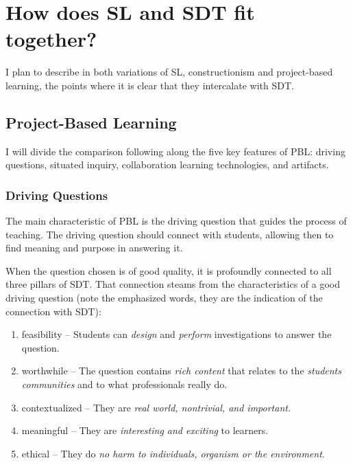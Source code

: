 \section{How does SL and SDT fit together?}

I plan to describe in both variations of SL, constructionism and project-based learning,
the points where it is clear that they intercalate with SDT. 

\subsection{Project-Based Learning}

I will divide the comparison following along the five key features of PBL:
driving questions, situated inquiry, collaboration learning technologies, and
artifacts.\cite{education:joseph_phyllis__pbl}

\subsubsection{Driving Questions}

The main characteristic of PBL is the driving question that guides the process
of teaching. The driving question should connect with students, allowing then to
find meaning and purpose in answering it.

When the question chosen is of good quality, it is profoundly connected to
all three pillars of SDT. That connection steams from the characteristics of a
good driving question (note the emphasized words, they are the indication of the
connection with SDT):\cite{education:joseph_phyllis__pbl}

\begin{enumerate}
\item feasibility -- Students can \emph{design} and \emph{perform}
investigations to answer the question.

\item worthwhile -- The question contains \emph{rich content} that relates to
the \emph{students communities} and to what professionals really do.

\item contextualized -- They are \emph{real world, nontrivial, and important}.

\item meaningful -- They are \emph{interesting and exciting} to learners.

\item ethical -- They do \emph{no harm to individuals, organism or the
environment}.
\end{enumerate}

